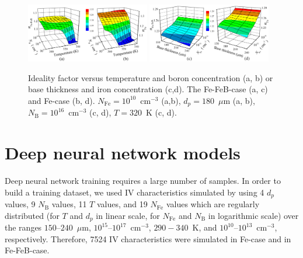 \documentclass[num-refs]{wiley-article} %
\begin{document}
\begin{figure}[t]
\centering
\includegraphics[width=0.48\textwidth]{Fig1a}
\includegraphics[width=0.48\textwidth]{Fig1b}
\caption{Ideality factor versus temperature and boron concentration (a, b)
or base thickness and iron concentration (c,d).
The Fe-FeB-case (a, c) and Fe-case (b, d).
$N_\mathrm{Fe}=10^{10}$~cm$^{-3}$ (a,b),
$d_p=180$~$\mu$m (a, b),
$N_\mathrm{B}=10^{16}$~cm$^{-3}$ (c, d),
$T=320$~K (c, d).
}
\label{fig_nValues}
\end{figure}

\section{Deep neural network models}

Deep neural network training  requires a large number of samples.
In order to build a training dataset, we used IV characteristics
simulated by using 4 $d_p$ values, 9 $N_\mathrm{B}$ values, 11 $T$ values, and 19 $N_{\mathrm{Fe}}$ values
which are regularly distributed
(for $T$ and $d_p$ in linear scale,
for  $N_{\mathrm{Fe}}$ and $N_\mathrm{B}$ in logarithmic scale)
over the  ranges $150$--$240$~$\mu$m, $10^{15}$--$10^{17}$~cm$^{-3}$, $290-340$~K, and
$10^{10}$--$10^{13}$~cm$^{-3}$, respectively.
Therefore, 7524 IV characteristics were simulated in Fe-case and in Fe-FeB-case.
\end{document}

